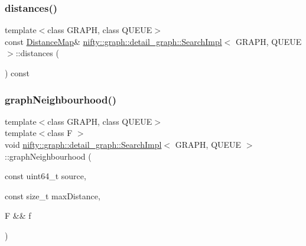 \subsubsection{\texorpdfstring{distances()}{distances()}}
{\footnotesize\ttfamily template$<$class G\+R\+A\+PH, class Q\+U\+E\+UE$>$ \\
const \hyperlink{classnifty_1_1graph_1_1detail__graph_1_1SearchImpl_a9f3e049a2ddbf34d81d9db4b7dd2839f}{Distance\+Map}\& \hyperlink{classnifty_1_1graph_1_1detail__graph_1_1SearchImpl}{nifty\+::graph\+::detail\+\_\+graph\+::\+Search\+Impl}$<$ G\+R\+A\+PH, Q\+U\+E\+UE $>$\+::distances (\begin{DoxyParamCaption}{ }\end{DoxyParamCaption}) const\hspace{0.3cm}{\ttfamily [inline]}}

\mbox{\label{classnifty_1_1graph_1_1detail__graph_1_1SearchImpl_a9c1d6dd401e9557df0f3a3a186ce13c1}} 
\subsubsection{\texorpdfstring{graph\+Neighbourhood()}{graphNeighbourhood()}}
{\footnotesize\ttfamily template$<$class G\+R\+A\+PH, class Q\+U\+E\+UE$>$ \\
template$<$class F $>$ \\
void \hyperlink{classnifty_1_1graph_1_1detail__graph_1_1SearchImpl}{nifty\+::graph\+::detail\+\_\+graph\+::\+Search\+Impl}$<$ G\+R\+A\+PH, Q\+U\+E\+UE $>$\+::graph\+Neighbourhood (\begin{DoxyParamCaption}\item[{const uint64\+\_\+t}]{source,  }\item[{const size\+\_\+t}]{max\+Distance,  }\item[{F \&\&}]{f }\end{DoxyParamCaption})\hspace{0.3cm}{\ttfamily [inline]}}

\mbox{\label{classnifty_1_1graph_1_1detail__graph_1_1SearchImpl_a750b41bd017661bedf213954e7e5c3cb}} 
